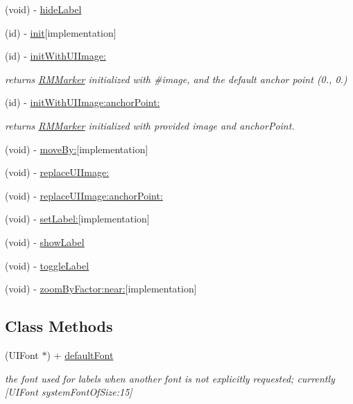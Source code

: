 \begin{DoxyCompactItemize}
\item 
(void) -\/ \hyperlink{interface_r_m_marker_a59b781fa30a11764bfb378650a20b01c}{hide\-Label}
\item 
(id) -\/ \hyperlink{interface_r_m_marker_ae896ffbfa063f34d49741f540b3f9201}{init}{\ttfamily  \mbox{[}implementation\mbox{]}}
\item 
(id) -\/ \hyperlink{interface_r_m_marker_a89dd90402903576e798ec555d5bf5ff5}{init\-With\-U\-I\-Image\-:}
\begin{DoxyCompactList}\small\item\em returns \hyperlink{interface_r_m_marker}{R\-M\-Marker} initialized with \#image, and the default anchor point (0., 0.) \end{DoxyCompactList}\item 
(id) -\/ \hyperlink{interface_r_m_marker_a37ad8cd65c9597bb5296e784503f92e0}{init\-With\-U\-I\-Image\-:anchor\-Point\-:}
\begin{DoxyCompactList}\small\item\em returns \hyperlink{interface_r_m_marker}{R\-M\-Marker} initialized with provided image and anchor\-Point. \end{DoxyCompactList}\item 
(void) -\/ \hyperlink{interface_r_m_marker_a96b0d02976d98b17a2d8383d9cb4c807}{move\-By\-:}{\ttfamily  \mbox{[}implementation\mbox{]}}
\item 
(void) -\/ \hyperlink{interface_r_m_marker_a906621c61e31e6759d977fe1086aff44}{replace\-U\-I\-Image\-:}
\item 
(void) -\/ \hyperlink{interface_r_m_marker_a2e50edfeb2efe837bcc1fb5962c874d9}{replace\-U\-I\-Image\-:anchor\-Point\-:}
\item 
(void) -\/ \hyperlink{interface_r_m_marker_a1a507346790dbd6b4d9f131362bb167e}{set\-Label\-:}{\ttfamily  \mbox{[}implementation\mbox{]}}
\item 
(void) -\/ \hyperlink{interface_r_m_marker_ac3cb506fdb758c68bbfb31dbc20ced0a}{show\-Label}
\item 
(void) -\/ \hyperlink{interface_r_m_marker_a0a6f1212f47120f99be764ed14b074fb}{toggle\-Label}
\item 
(void) -\/ \hyperlink{interface_r_m_marker_ad98fa242aceef563743c13963d8a79ca}{zoom\-By\-Factor\-:near\-:}{\ttfamily  \mbox{[}implementation\mbox{]}}
\end{DoxyCompactItemize}
\subsection*{Class Methods}
\begin{DoxyCompactItemize}
\item 
(U\-I\-Font $\ast$) + \hyperlink{interface_r_m_marker_a643af8a0d5028b5df597f2ab812e5ea8}{default\-Font}
\begin{DoxyCompactList}\small\item\em the font used for labels when another font is not explicitly requested; currently \mbox{[}U\-I\-Font system\-Font\-Of\-Size\-:15\mbox{]} \end{DoxyCompactList}\end{DoxyCompactItemize}
